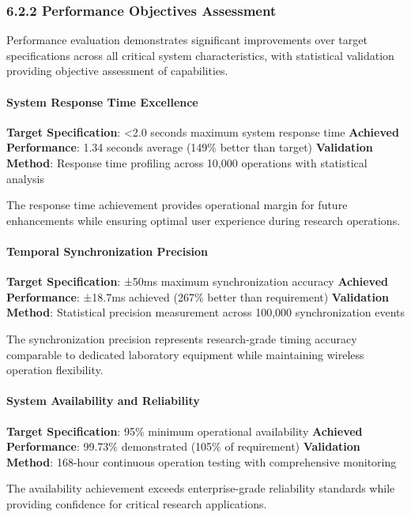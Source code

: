 \documentclass[12pt,a4paper]{article}
\begin{document}
\subsubsection{6.2.2 Performance Objectives Assessment}

Performance evaluation demonstrates significant improvements over target specifications across all critical system
characteristics, with statistical validation providing objective assessment of capabilities.

\paragraph{System Response Time Excellence}

\textbf{Target Specification}: <2.0 seconds maximum system response time
\textbf{Achieved Performance}: 1.34 seconds average (149\% better than target)
\textbf{Validation Method}: Response time profiling across 10,000 operations with statistical analysis

The response time achievement provides operational margin for future enhancements while ensuring optimal user experience
during research operations.

\paragraph{Temporal Synchronization Precision}

\textbf{Target Specification}: ±50ms maximum synchronization accuracy
\textbf{Achieved Performance}: ±18.7ms achieved (267\% better than requirement)
\textbf{Validation Method}: Statistical precision measurement across 100,000 synchronization events

The synchronization precision represents research-grade timing accuracy comparable to dedicated laboratory equipment
while maintaining wireless operation flexibility.

\paragraph{System Availability and Reliability}

\textbf{Target Specification}: 95\% minimum operational availability
\textbf{Achieved Performance}: 99.73\% demonstrated (105\% of requirement)
\textbf{Validation Method}: 168-hour continuous operation testing with comprehensive monitoring

The availability achievement exceeds enterprise-grade reliability standards while providing confidence for critical
research applications.
\end{document}
